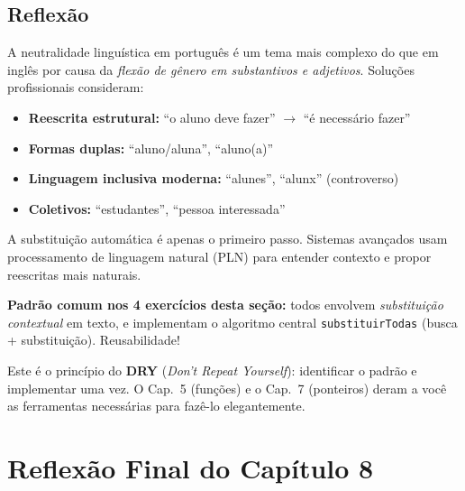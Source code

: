 \documentclass[12pt,a4paper]{article}
\begin{document}
\subsection*{Reflexão}

\begin{atencao}
A neutralidade linguística em português é um tema mais complexo do que em inglês
por causa da \textit{flexão de gênero em substantivos e adjetivos}. Soluções
profissionais consideram:

\begin{itemize}[noitemsep]
  \item \textbf{Reescrita estrutural:} ``o aluno deve fazer'' $\to$ ``é necessário fazer''
  \item \textbf{Formas duplas:} ``aluno/aluna'', ``aluno(a)''
  \item \textbf{Linguagem inclusiva moderna:} ``alunes'', ``alunx'' (controverso)
  \item \textbf{Coletivos:} ``estudantes'', ``pessoa interessada''
\end{itemize}

A substituição automática é apenas o primeiro passo. Sistemas avançados usam
processamento de linguagem natural (PLN) para entender contexto e propor
reescritas mais naturais.
\end{atencao}

\bigskip

\begin{boaprática}
\textbf{Padrão comum nos 4 exercícios desta seção:} todos envolvem
\textit{substituição contextual} em texto, e implementam o algoritmo central
\texttt{substituirTodas} (busca + substituição). Reusabilidade!

Este é o princípio do \textbf{DRY} (\textit{Don't Repeat Yourself}): identificar
o padrão e implementar uma vez. O Cap.~5 (funções) e o Cap.~7 (ponteiros) deram
a você as ferramentas necessárias para fazê-lo elegantemente.
\end{boaprática}

\newpage

\section*{Reflexão Final do Capítulo 8}
\end{document}
